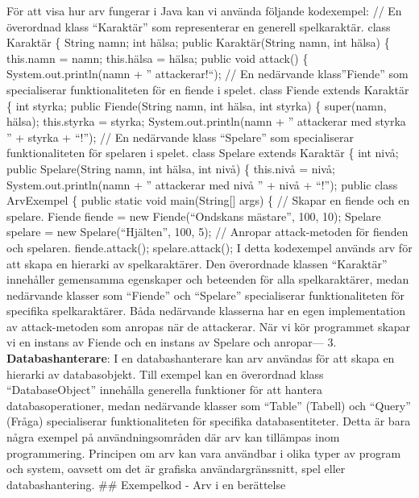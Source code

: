 För att visa hur arv fungerar i Java kan vi använda följande kodexempel:
// En överordnad klass ``Karaktär'' som representerar en generell
spelkaraktär. class Karaktär \{ String namn; int hälsa; public
Karaktär(String namn, int hälsa) \{ this.namn = namn; this.hälsa =
hälsa; public void attack() \{ System.out.println(namn + ''
attackerar!{}``); // En nedärvande klass''Fiende'' som specialiserar
funktionaliteten för en fiende i spelet. class Fiende extends Karaktär
\{ int styrka; public Fiende(String namn, int hälsa, int styrka) \{
super(namn, hälsa); this.styrka = styrka; System.out.println(namn + ''
attackerar med styrka '' + styrka + ``!''); // En nedärvande klass
``Spelare'' som specialiserar funktionaliteten för spelaren i spelet.
class Spelare extends Karaktär \{ int nivå; public Spelare(String namn,
int hälsa, int nivå) \{ this.nivå = nivå; System.out.println(namn + ''
attackerar med nivå '' + nivå + ``!''); public class ArvExempel \{
public static void main(String{[}{]} args) \{ // Skapar en fiende och en
spelare. Fiende fiende = new Fiende(``Ondskans mästare'', 100, 10);
Spelare spelare = new Spelare(``Hjälten'', 100, 5); // Anropar
attack-metoden för fienden och spelaren. fiende.attack();
spelare.attack(); I detta kodexempel används arv för att skapa en
hierarki av spelkaraktärer. Den överordnade klassen ``Karaktär''
innehåller gemensamma egenskaper och beteenden för alla spelkaraktärer,
medan nedärvande klasser som ``Fiende'' och ``Spelare'' specialiserar
funktionaliteten för specifika spelkaraktärer. Båda nedärvande klasserna
har en egen implementation av attack-metoden som anropas när de
attackerar. När vi kör programmet skapar vi en instans av Fiende och en
instans av Spelare och anropar--- 3. \textbf{Databashanterare}: I en
databashanterare kan arv användas för att skapa en hierarki av
databasobjekt. Till exempel kan en överordnad klass ``DatabaseObject''
innehålla generella funktioner för att hantera databasoperationer, medan
nedärvande klasser som ``Table'' (Tabell) och ``Query'' (Fråga)
specialiserar funktionaliteten för specifika databasentiteter. Detta är
bara några exempel på användningsområden där arv kan tillämpas inom
programmering. Principen om arv kan vara användbar i olika typer av
program och system, oavsett om det är grafiska användargränssnitt, spel
eller databashantering. \#\# Exempelkod - Arv i en berättelse

